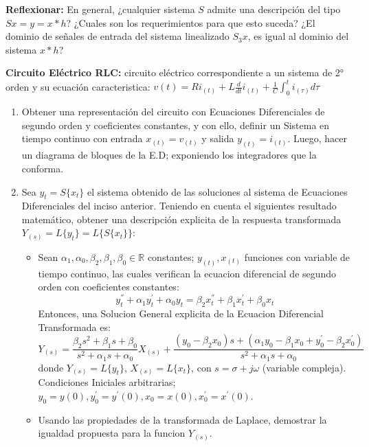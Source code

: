 \documentclass[12pt,a4paper]{report}
\begin{document}
\begin{enumerate}[label=\alph*)]
\begin{table}[h!]
\begin{tabular}{|c|c|c|c|}
        \end{tabular}
      \end{table}
      \textbf{Reflexionar:} En general, ¿cualquier sistema $S$ admite una descripción del tipo $S{x} = y = x * h$?
      ¿Cuales son los requerimientos para que esto suceda? ¿El dominio de señales de entrada del sistema linealizado
      $S_3{x}$, es igual al dominio del sistema $x * h$?


  \end{enumerate}

  \textbf{Circuito Eléctrico RLC:} circuito eléctrico correspondiente a un sistema de 2° orden y su ecuación caracteristica: $v(t) = Ri_{(t)} + L \frac{d}{dt} i_{(t)} + \frac{1}{C} \int_{0}^{t} i_{(\tau)} d\tau$

  \begin{enumerate}[label=\alph*)]
  \item Obtener una representación del circuito con Ecuaciones Diferenciales de segundo orden y coeficientes constantes, y con ello, definir un Sistema en tiempo continuo con entrada $x_{(t)} = v_{(t)}$ y salida $y_{(t)} = i_{(t)}$. Luego, hacer un diagrama de bloques de la E.D; exponiendo los integradores que la conforma.

  \item Sea $y_t = S\{x_t\}$ el sistema obtenido de las soluciones al sistema de Ecuaciones Diferenciales del inciso anterior. Teniendo en cuenta el siguientes resultado matemático, obtener una descripción explicita de la respuesta transformada $Y_{(s)} = L\{y_t\} = L\{S\{x_t\}\}$:
  \begin{itemize}
    \item Sean $\alpha_1, \alpha_0, \beta_2, \beta_1, \beta_0 \in \mathbb{R}$ constantes; $y_{(t)}, x_{(t)}$ funciones con variable de tiempo continuo, las cuales verifican la ecuacion diferencial de segundo orden con coeficientes constantes:
    $$y_t^{''} + \alpha_1 y_t^{'} + \alpha_0 y_t = \beta_2 x_t^{''} + \beta_1 x_t^{'} + \beta_0 x_t$$
    Entonces, una Solucion General explicita de la Ecuacion Diferencial Transformada es:
    $$Y_{(s)} = \frac{\beta_2 s^2 + \beta_1 s + \beta_0}{s^2 + \alpha_1 s + \alpha_0}X_{(s)} + \frac{(y_0 - \beta_2 x_0)s + (\alpha_1 y_0 - \beta_1 x_0 + y_0^{'} - \beta_2 x_0^{'})}{s^2 + \alpha_1 s + \alpha_0}$$
    donde $Y_{(s)} = L\{y_t\}$, $X_{(s)} = L\{x_t\}$, con $s = \sigma + j \omega$ (variable compleja). Condiciones Iniciales arbitrarias; $y_0 = y(0), y_0^{'} = y^{'}(0), x_0 = x(0), x_0^{'} = x^{'}(0)$.
    \item Usando las propiedades de la transformada de Laplace, demostrar la igualdad propuesta para la funcion $Y_{(s)}$.
  \end{itemize}


\end{enumerate}
\end{document}
